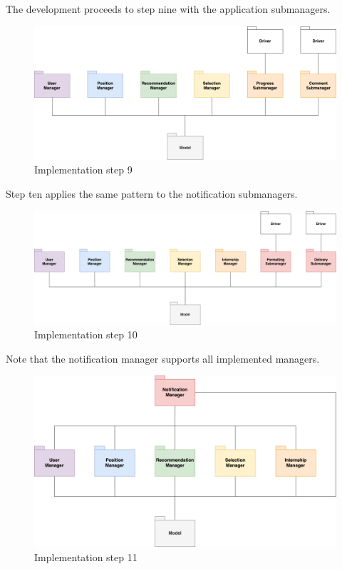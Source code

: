 \newpage
The development proceeds to step nine with the application submanagers.

\begin{figure}[h]
    \centering
    \includegraphics[width=16cm]{images/implementation-diagrams/step-9.png}
    \caption{Implementation step 9}
\end{figure}

\newpage
Step ten applies the same pattern to the notification submanagers.

\begin{figure}[h]
    \centering
    \includegraphics[width=16cm]{images/implementation-diagrams/step-10.png}
    \caption{Implementation step 10}
\end{figure}

\newpage
Note that the notification manager supports all implemented managers.

\begin{figure}[h]
    \centering
    \includegraphics[width=16cm]{images/implementation-diagrams/step-11.png}
    \caption{Implementation step 11}
\end{figure}
